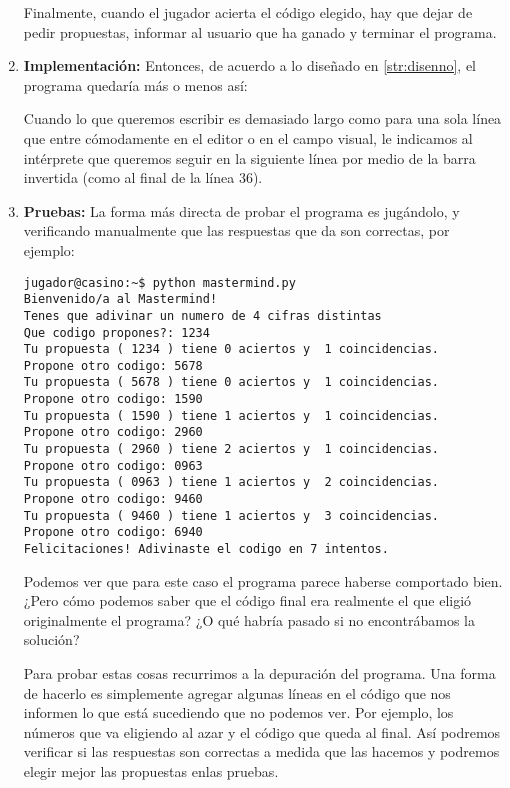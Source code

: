 \begin{enumerate}
Finalmente, cuando el jugador acierta el código elegido, hay que dejar de pedir
propuestas, informar al usuario que ha ganado y terminar el programa.

\item {\bf Implementación:}
Entonces, de acuerdo a lo diseñado en \ref{str:disenno}, el programa quedaría
más o menos así:



\begin{observacion}
Cuando lo que queremos escribir es demasiado largo como para una sola línea que
entre cómodamente en el editor o en el campo visual, le indicamos al intérprete
que queremos seguir en la siguiente línea por medio de la barra invertida (como
al final de la línea 36).
\end{observacion}

\item {\bf Pruebas:}
La forma más directa de probar el programa es jugándolo, y verificando
manualmente que las respuestas que da son correctas, por ejemplo:

\begin{verbatim}
jugador@casino:~$ python mastermind.py
Bienvenido/a al Mastermind!
Tenes que adivinar un numero de 4 cifras distintas
Que codigo propones?: 1234
Tu propuesta ( 1234 ) tiene 0 aciertos y  1 coincidencias.
Propone otro codigo: 5678
Tu propuesta ( 5678 ) tiene 0 aciertos y  1 coincidencias.
Propone otro codigo: 1590
Tu propuesta ( 1590 ) tiene 1 aciertos y  1 coincidencias.
Propone otro codigo: 2960
Tu propuesta ( 2960 ) tiene 2 aciertos y  1 coincidencias.
Propone otro codigo: 0963
Tu propuesta ( 0963 ) tiene 1 aciertos y  2 coincidencias.
Propone otro codigo: 9460
Tu propuesta ( 9460 ) tiene 1 aciertos y  3 coincidencias.
Propone otro codigo: 6940
Felicitaciones! Adivinaste el codigo en 7 intentos.
\end{verbatim}

Podemos ver que para este caso el programa parece haberse comportado bien.
¿Pero cómo podemos saber que el código final era realmente el que eligió
originalmente el programa? ¿O qué habría pasado si no encontrábamos la
solución?

Para probar estas cosas recurrimos a la depuración del programa. Una forma
de hacerlo es simplemente agregar algunas líneas en el código que nos
informen lo que está sucediendo que no podemos ver. Por ejemplo, los
números que va eligiendo al azar y el código que queda al final. Así
podremos verificar si las respuestas son correctas a medida que las hacemos
y podremos elegir mejor las propuestas enlas pruebas.


\end{enumerate}
